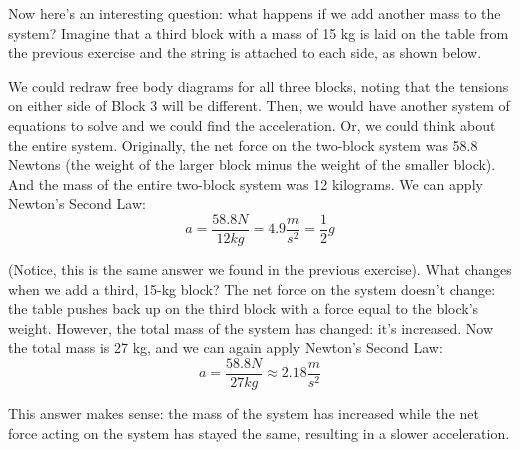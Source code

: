Now here's an interesting question: what happens if we add another mass to the 
system? Imagine that a third block with a mass of 15 kg is laid on the table 
from the previous exercise and the string is attached to each side, as shown 
below. 
\begin{center}
\end{center}

We could redraw free body diagrams for all three blocks, noting that the 
tensions on either side of Block 3 will be different. Then, we would have 
another system of equations to solve and we could find the acceleration. Or, 
we could think about the entire system. Originally, the net force on the 
two-block system was 58.8 Newtons (the weight of the larger block minus the 
weight of the smaller block). And the mass of the entire two-block system was 
12 kilograms. We can apply Newton's Second Law:
$$a = \frac{58.8 N}{12 kg} = 4.9 \frac{m}{s^2} = \frac{1}{2}g$$

(Notice, this is the same answer we found in the previous exercise). What 
changes when we add a third, 15-kg block? The net force on the system doesn't 
change: the table pushes back up on the third block with a force equal to the 
block's weight. However, the total mass of the system has changed: it's 
increased. Now the total mass is 27 kg, and we can again apply Newton's Second 
Law:
$$a = \frac{58.8 N}{27 kg} \approx 2.18 \frac{m}{s^2}$$

This answer makes sense: the mass of the system has increased while the net 
force acting on the system has stayed the same, resulting in a slower acceleration. 

